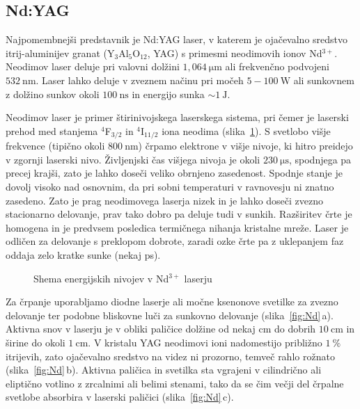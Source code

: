 \subsection{Nd:YAG}
Najpomembnejši predstavnik je Nd:YAG laser, v katerem je ojačevalno sredstvo
itrij-aluminijev granat (Y$_3$Al$_5$O$_{12}$, YAG) s primesmi neodimovih ionov Nd$^{3+}$. 
Neodimov laser deluje pri valovni dolžini $1,064~\si{\micro\meter}$ ali frekvenčno podvojeni
$532~\si{\nano\metre}$. Laser lahko deluje v zveznem 
načinu pri močeh $5-100~\si{\watt}$ ali sunkovnem z dolžino sunkov okoli 
$100~\si{\nano\second}$ in energijo sunka $\sim 1~\si{\joule}$.

Neodimov laser je primer štirinivojskega laserskega sistema, 
pri čemer je 
laserski prehod med stanjema $^4$F$_{3/2}$ in $^4$I$_{11/2}$ iona neodima 
(slika~\ref{fig:NdE}). S svetlobo višje frekvence 
(tipično okoli $800~\si{\nano\metre}$) črpamo elektrone v višje nivoje, ki hitro 
preidejo v zgornji laserski nivo. Življenjski čas višjega nivoja je 
okoli $230~\si{\micro\second}$, spodnjega pa precej krajši, zato je 
lahko doseči veliko obrnjeno zasedenost. Spodnje stanje je dovolj visoko nad 
osnovnim, da pri sobni temperaturi v ravnovesju ni znatno zasedeno. Zato je 
prag neodimovega laserja nizek in je lahko doseči zvezno stacionarno delovanje, 
prav tako dobro pa deluje tudi v sunkih. Razširitev črte je homogena in je predvsem posledica
termičnega nihanja kristalne mreže. Laser je odličen za delovanje s preklopom dobrote, 
zaradi ozke črte pa z uklepanjem faz oddaja zelo kratke sunke (nekaj ps). 
\begin{figure}[h]
\centering
\def\svgwidth{85truemm} 

\caption{Shema energijskih nivojev v Nd$^{3+}$ laserju}
\label{fig:NdE}
\end{figure}

Za črpanje uporabljamo diodne laserje ali močne ksenonove svetilke za zvezno delovanje 
ter podobne bliskovne luči za sunkovno delovanje (slika~\ref{fig:Nd}\,a). 
Aktivna snov v laserju je v obliki paličice dolžine od nekaj cm do dobrih 
$10~\si{\centi\metre}$ in širine do okoli $1~\si{\centi\metre}$. 
V kristalu YAG neodimovi ioni nadomestijo približno $1~\%$ itrijevih, zato ojačevalno
sredstvo na videz ni prozorno, temveč rahlo rožnato (slika~\ref{fig:Nd}\,b). 
Aktivna paličica in svetilka sta vgrajeni v cilindrično ali eliptično votlino z 
zrcalnimi ali belimi stenami, tako da se čim večji del črpalne svetlobe absorbira v 
laserski paličici (slika~\ref{fig:Nd}\,c).

